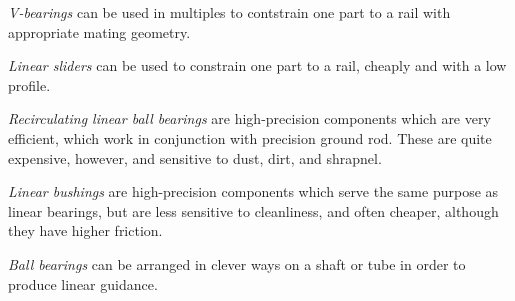 \documentclass[10pt,letterpaper]{book}
\begin{document}
	\begin{asparaenum}[a)]
		\item \textit{V-bearings} can be used in multiples to contstrain one part to a rail with appropriate mating geometry.
		\item \textit{Linear sliders} can be used to constrain one part to a rail, cheaply and with a low profile.
		\item \textit{Recirculating linear ball bearings} are high-precision components which are very efficient, which work in conjunction with precision ground rod. These are quite expensive, however, and sensitive to dust, dirt, and shrapnel.
		\item \textit{Linear bushings} are high-precision components which serve the same purpose as linear bearings, but are less sensitive to cleanliness, and often cheaper, although they have higher friction.
		\item \textit{Ball bearings} can be arranged in clever ways on a shaft or tube in order to produce linear guidance.
	\end{asparaenum}
\end{document}

